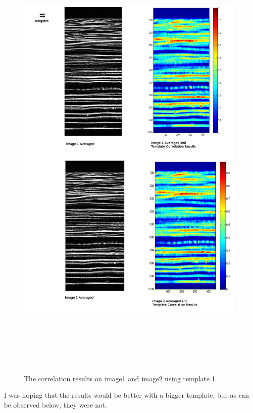 \documentclass[11pt,psfig]{article}
\begin{document}
\begin{figure}[H]
\centering
\includegraphics[height=9in]{correlationResults_template1.jpg}
\caption{The correlation results on image1 and image2 using template 1}
\end{figure}
I was hoping that the results would be better with a bigger template, but as can be observed below, they were not.
\end{document}
